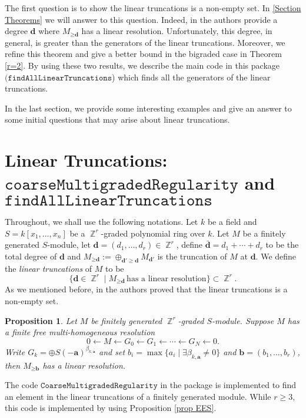 \documentclass[11pt]{amsart}
\DeclareMathOperator{\Z}{\mathbb{Z}}
\newtheorem{prop}[thm]{Proposition}
\theoremstyle{definition}
\begin{document}
The first question is to show the linear truncations is a non-empty set.  In  \autoref{Section Theorems} we will answer to this question. Indeed, in  \cite{EisenbudErmanSchreyer}  the authors provide a degree $\textbf{d}$  where $M_{\geq \textbf{d}}$ has a linear resolution. Unfortunately, this degree, in general,  is greater than the generators of the linear truncations. Moreover, we refine this theorem and give a better bound in the bigraded case in Theorem \autoref{r=2}. By using these two results, we describe the main code in this package $(\mathtt{findAllLinearTruncations}$) which finds all the generators of the linear truncations. 

In the last section, we provide some interesting examples and give an answer to some initial questions  that may arise about linear truncations. 

\section{Linear Truncations: \\ $\mathtt{coarseMultigradedRegularity}$ and  $\mathtt{findAllLinearTruncations}$ }\label{Section Theorems}
\noindent Throughout, we shall use the following notations. Let $k$ be a field and $S=k[x_1,\dots ,x_n]$ be a $\Z^r$-graded polynomial ring over $k$. Let $M$ be a finitely generated $S$-module, let $\textbf{d}=(d_1,\dots,d_r)\in \Z^r$, define $\bar{\textbf{d}}=d_1+\cdots +d_r$ to be the total degree of $\textbf{d}$ and  $M_{\geq \textbf{d}}:= \oplus _{\textbf{d}'\geq \textbf{d}} M_{\textbf{d}'}$ is the truncation of $M$ at $\textbf{d}$. 
 We define the \textit{linear truncations} of $M$ to  be 
 $$
 \{ \textbf{d} \in \Z^r \mid M_{\geq \textbf{d}} \,\text{has a linear resolution}\}\subset \Z^r.
 $$
As we mentioned before, in \cite{EisenbudErmanSchreyer} the authors proved that the linear truncations is a non-empty set.
 \begin{prop}\cite[Proposition 1.7 ]{EisenbudErmanSchreyer}\label{prop EES}
 Let $M$ be finitely generated $\Z^r$-graded $S$-module. Suppose $M$ has a finite free multi-homogeneous resolution
 $$
 0\leftarrow M\leftarrow G_0\leftarrow G_1\leftarrow \cdots \leftarrow G_N\leftarrow 0.
 $$
 Write $G_k= \oplus S(-\textbf{a})^{\beta_{k,\textbf{a}}}$ and set $b_i = \max \{ a_i \mid \exists \beta_{k,\textbf{a}}\neq 0 \}$ and $\textbf{b}=(b_1,\dots,b_r)$, then $M_{\geq \textbf{b}}$ has a linear resolution.
 \end{prop}
The code $\mathtt{CoarseMultigradedRegularity}$ in the package is implemented to find an element in the linear truncations of a finitely generated module. While $r\geq 3$, this code is implemented by using  Proposition \autoref{prop EES}.
\end{document}
